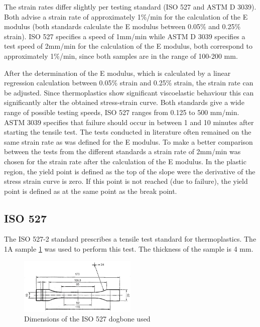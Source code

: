 The strain rates differ slightly per testing standard (ISO 527 and ASTM D 3039). Both advise a strain rate of approximately 1\%/min for the calculation of the E modulus (both standards  calculate the E modulus between 0.05\% and 0.25\% strain).  ISO 527 specifies a speed of 1mm/min while ASTM D 3039 specifies a test speed of 2mm/min for the calculation of the E modulus, both correspond to approximately 1\%/min, since both samples are in the range of 100-200 mm.

After the determination of the E modulus, which is calculated by a linear regression calculation between 0.05\% strain and 0.25\% strain, the strain rate can be adjusted. Since thermoplastics show significant viscoelastic behaviour this can significantly alter the obtained stress-strain curve. Both standards give a wide range of possible testing speeds, ISO 527 ranges from 0.125 to 500 mm/min. ASTM 3039 specifies that failure should occur in between 1 and 10 minutes after starting the tensile test. The tests conducted in literature often remained on the same strain rate as was defined for the E modulus. To make a better comparison between the tests from the different standards a strain rate of 2mm/min was chosen for the strain rate after the calculation of the E modulus.
In the plastic region, the yield point is defined as the top of the slope were the derivative of the stress strain curve is zero. If this point is not reached (due to failure), the yield point is defined as at the same point as the break point.

\subsection{ISO 527}
The ISO 527-2 standard \cite{Afd2016NEN-EN-ISO527-2} prescribes a tensile test standard for thermoplastics. The 1A sample \ref{fig:ISO527} was used to perform this test. The thickness of the sample is 4 mm.
\begin{figure}[H]
    \centering
    \includegraphics[width=0.50\textwidth]{chapter_5_Experimentaltesting/figures/ISO527specimen.png}
    \caption{Dimensions of the ISO 527 dogbone used}
    \label{fig:ISO527}
\end{figure}
